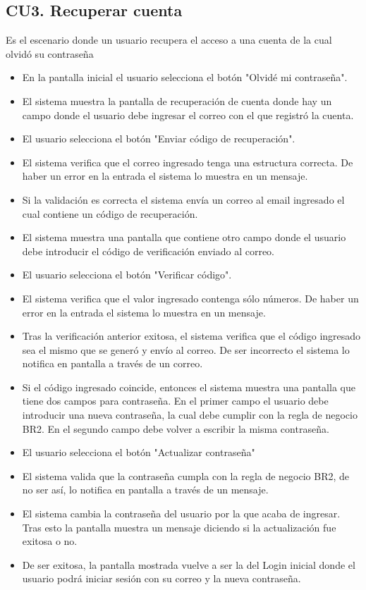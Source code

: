 \subsection{CU3. Recuperar cuenta}  \par
Es el escenario donde un usuario recupera el acceso a una cuenta de la cual olvidó su contraseña
\begin{itemize}
	\item En la pantalla inicial el usuario selecciona el botón "Olvidé mi contraseña".
	\item El sistema muestra la pantalla de recuperación de cuenta donde hay un campo donde el usuario debe ingresar el correo con el que registró la cuenta.
	\item El usuario selecciona el botón "Enviar código de recuperación".
	\item El sistema verifica que el correo ingresado tenga una estructura correcta. De haber un error en la entrada el sistema lo muestra en un mensaje.
	\item Si la validación es correcta el sistema envía un correo al email ingresado el cual contiene un código de recuperación.
	\item El sistema muestra una pantalla que contiene otro campo donde el usuario debe introducir el código de verificación enviado al correo.
	\item El usuario selecciona el botón "Verificar código".
	\item El sistema verifica que el valor ingresado contenga sólo números. De haber un error en la entrada el sistema lo muestra en un mensaje.
	\item Tras la verificación anterior exitosa, el sistema verifica que el código ingresado sea el mismo que se generó y envío al correo. De ser incorrecto el sistema lo notifica en pantalla a través de un correo.
	\item Si el código ingresado coincide, entonces el sistema muestra una pantalla que tiene dos campos para contraseña. En el primer campo el usuario debe introducir una nueva contraseña, la cual debe cumplir con la regla de negocio BR2. En el segundo campo debe volver a escribir la misma contraseña.
	\item El usuario selecciona el botón "Actualizar contraseña"
	\item El sistema valida que la contraseña cumpla con la regla de negocio BR2, de no ser así, lo notifica en pantalla a través de un mensaje.
	\item El sistema cambia la contraseña del usuario por la que acaba de ingresar. Tras esto la pantalla muestra un mensaje diciendo si la actualización fue exitosa o no.
	\item De ser exitosa, la pantalla mostrada vuelve a ser la del Login inicial donde el usuario podrá iniciar sesión con su correo y la nueva contraseña.
\end{itemize}

